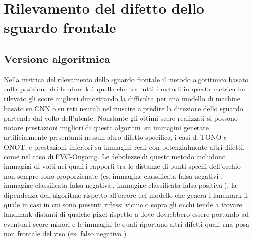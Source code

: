 \documentclass[12pt,a4paper,openright,twoside]{book}
\begin{document}
\section{Rilevamento del difetto dello sguardo frontale}
\subsection{Versione algoritmica}
Nella metrica del rilevamento dello sguardo frontale il metodo algoritmico basato sulla posizione dei landmark è quello che tra tutti i metodi in questa metrica ha rilevato gli score migliori dimostrando la difficolta per una modello di machine basato su CNN o su reti neurali nel riuscire a predire la direzione dello sguardo partendo dal volto dell'utente. Nonstante gli ottimi score realizzati si possono notare prestazioni migliori di questo algoritmi su immagini generate artificialmente presentanti nessun altro difetto specifico, i casi di TONO e ONOT, e prestazioni inferiori su immagini reali con potenzialmente altri difetti, come nel caso di FVC-Ongoing. Le debolezze di questo metodo includono immagini di volti nei quali i rapporti tra le distanze di punti specifi dell'occhio non sempre sono proporzionate (es. immagine classificata falsa negativi , immagine classificata falsa negativa , immagine classificata falsa positiva ), la dipendenza dell'algoritmo rispetto all'errore del modello che genera i landmark il quale in casi in cui sono presenti riflessi vicino o sopra gli occhi tende a trovare landmark distanti di qualche pixel rispetto a dove dovrebbero essere portando ad eventuali score minori e le immagini le quali riportano altri difetti quali una posa non frontale del viso (es. falso negativo )
\end{document}
